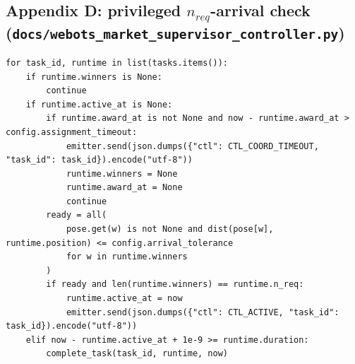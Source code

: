 \documentclass[conference]{IEEEtran}
\begin{document}
\subsection*{Appendix D: privileged $n_{req}$-arrival check (\texttt{docs/webots\_market\_supervisor\_controller.py})}
\begin{lstlisting}[style=py,firstnumber=440]
for task_id, runtime in list(tasks.items()):
    if runtime.winners is None:
        continue
    if runtime.active_at is None:
        if runtime.award_at is not None and now - runtime.award_at > config.assignment_timeout:
            emitter.send(json.dumps({"ctl": CTL_COORD_TIMEOUT, "task_id": task_id}).encode("utf-8"))
            runtime.winners = None
            runtime.award_at = None
            continue
        ready = all(
            pose.get(w) is not None and dist(pose[w], runtime.position) <= config.arrival_tolerance
            for w in runtime.winners
        )
        if ready and len(runtime.winners) == runtime.n_req:
            runtime.active_at = now
            emitter.send(json.dumps({"ctl": CTL_ACTIVE, "task_id": task_id}).encode("utf-8"))
    elif now - runtime.active_at + 1e-9 >= runtime.duration:
        complete_task(task_id, runtime, now)
\end{lstlisting}
\end{document}

